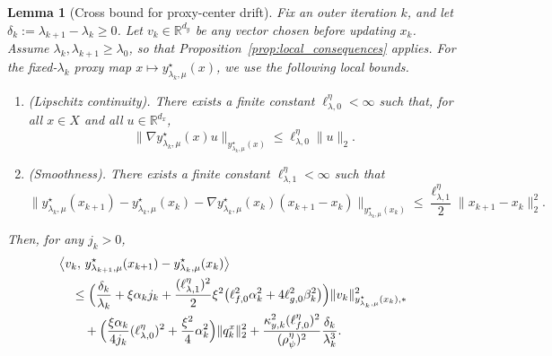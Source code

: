 \documentclass{article}
\newtheorem{lemma}{Lemma}
\begin{document}
\begin{lemma}[Cross bound for proxy-center drift]
\label{lem:proxy_center_cross_bound}
Fix an outer iteration \(k\), and let \(\delta_k:=\lambda_{k+1}-\lambda_k\ge0\). Let
\(v_k\in\mathbb R^{d_y}\) be any vector chosen before updating \(x_k\). Assume
\(\lambda_k,\lambda_{k+1}\ge\lambda_0\), so that Proposition~\ref{prop:local_consequences} applies.
For the fixed-\(\lambda_k\) proxy map \(x\mapsto y_{\lambda_k,\mu}^\star(x)\), we use the following
local bounds.

\begin{enumerate}
\item[\textup{(J0)}] \textup{(Lipschitz continuity).}
There exists a finite constant \(\ell_{\lambda,0}^\eta<\infty\) such that, for all
\(x\in X\) and all \(u\in\mathbb R^{d_x}\),
\begin{equation}
\label{eq:proxy_map_jacobian_bound}
\|\nabla y_{\lambda_k,\mu}^\star(x)u\|_{y_{\lambda_k,\mu}^\star(x)}
\le
\ell_{\lambda,0}^\eta\|u\|_2 .
\end{equation}

\item[\textup{(J1)}] \textup{(Smoothness).}
There exists a finite constant \(\ell_{\lambda,1}^\eta<\infty\) such that
\begin{equation}
\label{eq:proxy_map_taylor_remainder}
\Big\|
y_{\lambda_k,\mu}^\star(x_{k+1})-y_{\lambda_k,\mu}^\star(x_k)
-\nabla y_{\lambda_k,\mu}^\star(x_k)(x_{k+1}-x_k)
\Big\|_{y_{\lambda_k,\mu}^\star(x_k)}
\le
\frac{\ell_{\lambda,1}^\eta}{2}\|x_{k+1}-x_k\|_2^2 .
\end{equation}
\end{enumerate}

Then, for any \(j_k>0\),
\begin{align}
\label{eq:proxy_center_cross_bound}
&\big\langle v_k,\,
y_{\lambda_{k+1},\mu}^\star(x_{k+1})
-y_{\lambda_k,\mu}^\star(x_k)
\big\rangle
\nonumber\\
&\quad\le
\Bigl(
\frac{\delta_k}{\lambda_k}
+
\xi\alpha_k j_k
+
\frac{(\ell_{\lambda,1}^\eta)^2}{2}\xi^2
\bigl(\ell_{f,0}^2\alpha_k^2+4\ell_{g,0}^2\beta_k^2\bigr)
\Bigr)
\|v_k\|_{y_{\lambda_k,\mu}^\star(x_k),*}^2
\nonumber\\
&\qquad
+
\Bigl(
\frac{\xi\alpha_k}{4j_k}(\ell_{\lambda,0}^\eta)^2
+
\frac{\xi^2}{4}\alpha_k^2
\Bigr)\|q_k^x\|_2^2
+
\frac{\kappa_{y,k}^2(\ell_{f,0}^\eta)^2}{(\rho_\psi^\eta)^2}
\frac{\delta_k}{\lambda_k^3}.
\end{align}
\end{lemma}
\end{document}
